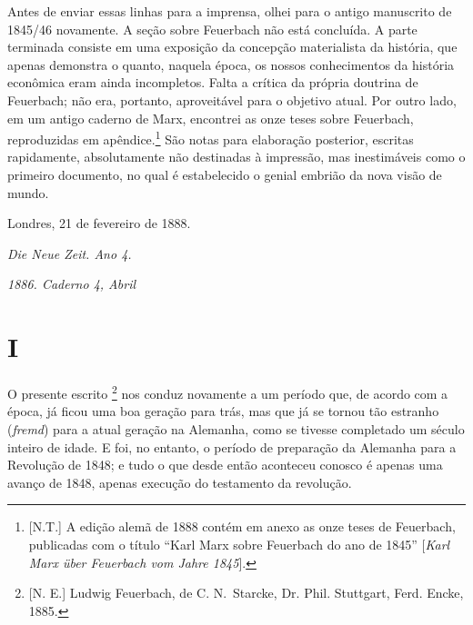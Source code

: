 Antes de enviar essas linhas para a imprensa, olhei para o antigo
manuscrito de 1845/46 novamente. A seção sobre Feuerbach não está
concluída. A parte terminada consiste em uma exposição da concepção
materialista da história, que apenas demonstra o quanto, naquela época,
os nossos conhecimentos da história econômica eram ainda incompletos.
Falta a crítica da própria doutrina de Feuerbach; não era, portanto,
aproveitável para o objetivo atual. Por outro lado, em um antigo caderno
de Marx, encontrei as onze teses sobre Feuerbach, reproduzidas em
apêndice.\footnote{{[}N.T.{]} A edição alemã de 1888 contém em anexo as
  onze teses de Feuerbach, publicadas com o título ``Karl Marx sobre
  Feuerbach do ano de 1845'' {[}\emph{Karl Marx über Feuerbach vom Jahre
  1845}{]}.} São notas para elaboração posterior, escritas rapidamente,
absolutamente não destinadas à impressão, mas inestimáveis ​​como o
primeiro documento, no qual é estabelecido o genial embrião da nova
visão de mundo.

\bigskip

\hfill{}Londres, 21 de fevereiro de 1888.

\pagebreak

\hfill{}\emph{Die Neue Zeit. Ano 4.}

\hfill{}\emph{1886. Caderno 4, Abril}

\section{I}

O presente escrito \footnote{{[}N. E.{]} Ludwig Feuerbach, de C.
  N.~Starcke, Dr. Phil. Stuttgart, Ferd. Encke, 1885.}\protect\hypertarget{r1}{}{}
nos conduz novamente a um período que, de acordo com a época, já ficou
uma boa geração para trás, mas que já se tornou tão estranho
(\emph{fremd}) para a atual geração na Alemanha, como se tivesse
completado um século inteiro de idade. E foi, no entanto, o período de
preparação da Alemanha para a Revolução de 1848; e tudo o que desde
então aconteceu conosco é apenas uma avanço de 1848, apenas execução do
testamento da revolução.

